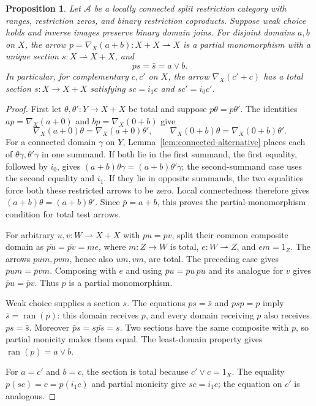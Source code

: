 \documentclass[11pt]{article}
\newtheorem{proposition}[theorem]{Proposition}
\newcommand{\ran}{\operatorname{ran}}
\begin{document}
\begin{proposition}\label{prop:local-switch}
Let $\mathcal A$ be a locally connected split restriction category with
ranges, restriction zeros, and binary restriction coproducts. Suppose
weak choice holds and inverse images preserve binary domain joins.
For disjoint domains $a,b$ on $X$, the arrow
$p=\nabla_X(a+b):X+X\rightharpoonup X$ is a partial monomorphism
with a unique section $s:X\rightharpoonup X+X$, and
\[
 ps=\bar s=a\vee b.
\]
In particular, for complementary $c,c'$ on $X$, the arrow
$\nabla_X(c'+c)$ has a total section $s:X\to X+X$ satisfying
$sc=i_1c$ and $sc'=i_0c'$.
\end{proposition}
\begin{proof}
First let $\theta,\theta':Y\to X+X$ be total and suppose
$p\theta=p\theta'$. The identities
$ap=\nabla_X(a+0)$ and $bp=\nabla_X(0+b)$ give
\[
 \nabla_X(a+0)\theta=\nabla_X(a+0)\theta',
 \qquad
 \nabla_X(0+b)\theta=\nabla_X(0+b)\theta'.
\]
For a connected domain $\gamma$ on $Y$,
Lemma~\ref{lem:connected-alternative} places each of
$\theta\gamma,\theta'\gamma$ in one summand.
If both lie in the first summand, the first equality, followed by $i_0$,
gives $(a+b)\theta\gamma=(a+b)\theta'\gamma$; the second-summand
case uses the second equality and $i_1$.
If they lie in opposite summands, the two equalities force both these
restricted arrows to be zero. Local connectedness therefore gives
$(a+b)\theta=(a+b)\theta'$. Since $\bar p=a+b$, this proves the
partial-monomorphism condition for total test arrows.

For arbitrary $u,v:W\rightharpoonup X+X$ with $pu=pv$, split their
common composite domain as
$\overline{pu}=\overline{pv}=me$, where $m:Z\to W$ is total,
$e:W\rightharpoonup Z$, and $em=1_Z$. The arrows $pum,pvm$, hence also $um,vm$, are total.
The preceding case gives $\bar p um=\bar p vm$. Composing with $e$
and using $\bar p u=\bar p u\,\overline{pu}$ and its analogue for $v$
gives $\bar p u=\bar p v$. Thus $p$ is a partial monomorphism.

Weak choice supplies a section $s$. The equations $ps=\bar s$ and
$psp=p$ imply $\bar s=\ran(p)$: this domain receives $p$, and every
domain receiving $p$ also receives $ps=\bar s$. Moreover
$\bar p s=s\overline{ps}=s$. Two sections have the same composite
with $p$, so partial monicity makes them equal.
The least-domain property gives $\ran(p)=a\vee b$.

For $a=c'$ and $b=c$, the section is total because $c'\vee c=1_X$.
The equality $p(sc)=c=p(i_1c)$ and partial monicity give $sc=i_1c$;
the equation on $c'$ is analogous.
\end{proof}
\end{document}
